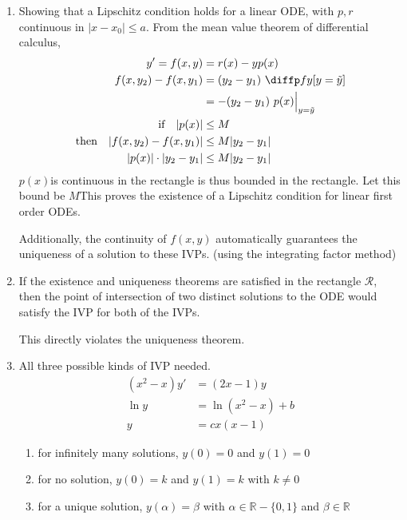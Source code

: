 \begin{enumerate}
    \item Showing that a Lipschitz condition holds for a linear ODE, with $ p, r $
          continuous in $ |x - x_{0}| \leq a $. From the mean value theorem of
          differential calculus,
          \begin{align}
              y' = f(x, y)                 & = r(x) - yp(x)        \\
              f(x, y_{2}) - f(x, y_{1})    & = (y_{2} - y_{1})
              \ \diffp fy[y = \tilde{y}]                           \\
                                           & = -(y_{2} - y_{1})
              \  p(x) \Big|_{y = \tilde{y}}                        \\
              \text{if} \quad |p(x)|       & \leq M \quad          \\
              \text{then} \quad |f(x, y_{2}) - f(x, y_{1})|
                                           & \leq M|y_{2} - y_{1}| \\
              |p(x)| \cdot |y_{2} - y_{1}| & \leq M|y_{2} - y_{1}|
          \end{align}
          $ p(x) $is continuous in the rectangle is thus bounded in the rectangle.
          Let this bound be $ M $This proves the existence of a Lipschitz condition
          for linear first order ODEs. \par
          Additionally, the continuity of $ f(x, y) $ automatically guarantees
          the uniqueness of a solution to these IVPs. (using the integrating
          factor method)

    \item If the existence and uniqueness theorems are satisfied in the rectangle
          $ \mathcal{R} $, then the point of intersection of two distinct solutions to
          the ODE would satisfy the IVP for both of the IVPs. \par
          This directly violates the uniqueness theorem.

    \item All three possible kinds of IVP needed.
          \begin{align}
              (x^{2} - x)y' & = (2x - 1)y         \\
              \ln y         & = \ln (x^{2}-x) + b \\
              y             & = cx(x-1)
          \end{align}
          \begin{enumerate}
              \item for infinitely many solutions, $ y(0) = 0 $ and $ y(1) = 0 $
              \item for no solution, $ y(0) = k $ and $ y(1) = k $ with $ k \neq 0 $
              \item for a unique solution, $ y(\alpha) = \beta $ with
                    $ \alpha \in \mathbb{R} - \{0, 1\} $ and $ \beta \in \mathbb{R} $
          \end{enumerate}
\end{enumerate}